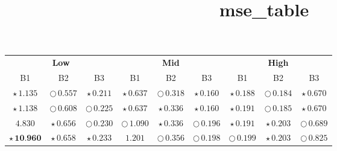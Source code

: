 \documentclass[
]{article}
\title{mse\_table}
\author{}
\date{\vspace{-2.5em}}
\begin{document}
\maketitle

\begin{table}[!h]
\centering
\begin{tabular}[t]{ccccccccc}
\toprule
\multicolumn{3}{c}{\textbf{Low}} & \multicolumn{3}{c}{\textbf{Mid}} & \multicolumn{3}{c}{\textbf{High}} \\
\cmidrule(l{3pt}r{3pt}){1-3} \cmidrule(l{3pt}r{3pt}){4-6} \cmidrule(l{3pt}r{3pt}){7-9}
B1 & B2 & B3 & B1 & B2 & B3 & B1 & B2 & B3\\
\midrule
\cellcolor[HTML]{2297E6}$\star\,\textit{1.135}$ & \cellcolor[HTML]{2297E6}$\bigcirc\,\textit{0.557}$ & \cellcolor[HTML]{F5C710}$\star\,\textit{0.211}$ & \cellcolor[HTML]{DF536B}$\star\,\textit{0.637}$ & \cellcolor[HTML]{F5C710}$\bigcirc\,\textit{0.318}$ & \cellcolor[HTML]{DF536B}$\star\,\textit{0.160}$ & \cellcolor[HTML]{F5C710}$\star\,\textit{0.188}$ & \cellcolor[HTML]{2297E6}$\bigcirc\,\textit{0.184}$ & \cellcolor[HTML]{DF536B}$\star\,\textit{0.670}$\\
\cellcolor[HTML]{DF536B}$\star\,\textit{1.138}$ & \cellcolor[HTML]{DF536B}$\bigcirc\,\textit{0.608}$ & \cellcolor[HTML]{F5C710}$\bigcirc\,\textit{0.225}$ & \cellcolor[HTML]{2297E6}$\star\,\textit{0.637}$ & \cellcolor[HTML]{DF536B}$\star\,\textit{0.336}$ & \cellcolor[HTML]{2297E6}$\star\,\textit{0.160}$ & \cellcolor[HTML]{DF536B}$\star\,\textit{0.191}$ & \cellcolor[HTML]{DF536B}$\bigcirc\,\textit{0.185}$ & \cellcolor[HTML]{2297E6}$\star\,\textit{0.670}$\\
\cellcolor[HTML]{FFFFFF}$4.830$ & \cellcolor[HTML]{2297E6}$\star\,\textit{0.656}$ & \cellcolor[HTML]{2297E6}$\bigcirc\,\textit{0.230}$ & \cellcolor[HTML]{DF536B}$\bigcirc\,\textit{1.090}$ & \cellcolor[HTML]{2297E6}$\star\,\textit{0.336}$ & \cellcolor[HTML]{DF536B}$\bigcirc\,\textit{0.196}$ & \cellcolor[HTML]{2297E6}$\star\,\textit{0.191}$ & \cellcolor[HTML]{DF536B}$\star\,\textit{0.203}$ & \cellcolor[HTML]{DF536B}$\bigcirc\,\textit{0.689}$\\
\cellcolor[HTML]{2297E6}$\star\,\textbf{10.960}$ & \cellcolor[HTML]{DF536B}$\star\,\textit{0.658}$ & \cellcolor[HTML]{2297E6}$\star\,\textit{0.233}$ & \cellcolor[HTML]{FFFFFF}$1.201$ & \cellcolor[HTML]{2297E6}$\bigcirc\,\textit{0.356}$ & \cellcolor[HTML]{2297E6}$\bigcirc\,\textit{0.198}$ & \cellcolor[HTML]{DF536B}$\bigcirc\,\textit{0.199}$ & \cellcolor[HTML]{2297E6}$\star\,\textit{0.203}$ & \cellcolor[HTML]{2297E6}$\bigcirc\,\textit{0.825}$\\

\end{tabular}
\end{table}
\end{document}
